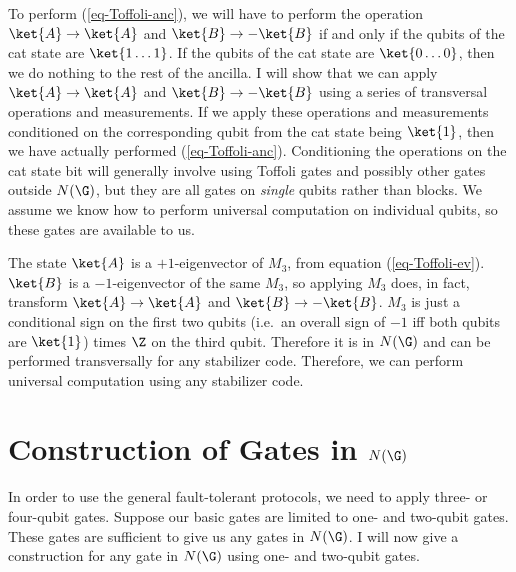 To perform (\ref{eq-Toffoli-anc}), we will have to perform the operation
$\ket{A} \rightarrow \ket{A}$ and $\ket{B} \rightarrow - \ket{B}$ if and
only if the
qubits of the cat state are $\ket{1 \ldots 1}$.  If the qubits of the cat state
are $\ket{0 \ldots 0}$, then we do nothing to the rest of the ancilla.  I will
show that we can apply $\ket{A} \rightarrow \ket{A}$ and $\ket{B}
\rightarrow - \ket{B}$ using a series of transversal operations and
measurements.  If we apply these operations and measurements
conditioned on the corresponding qubit from the cat state being $\ket{1}$,
then we have actually performed (\ref{eq-Toffoli-anc}).  Conditioning the
operations on the cat state bit will generally involve using Toffoli gates and
possibly other gates outside $N(\G)$, but they are all gates on {\em single}
qubits rather than blocks.  We assume we know how to perform universal
computation on individual qubits, so these gates are available to us.

The state $\ket{A}$ is a $+1$-eigenvector of $M_3$, from equation
(\ref{eq-Toffoli-ev}).  $\ket{B}$ is a $-1$-eigenvector of the same $M_3$,
so applying $M_3$ does, in fact, transform $\ket{A} \rightarrow \ket{A}$
and $\ket{B} \rightarrow - \ket{B}$.  $M_3$ is just a conditional sign on
the first two qubits (i.e.\ an overall sign of $-1$ iff both qubits are
$\ket{1}$) times $\Z$ on the third qubit.  Therefore it is in $N(\G)$ and
can be performed transversally for any stabilizer code.  Therefore, we can
perform universal computation using any stabilizer code.

\section{Construction of Gates in $N(\G)$}

In order to use the general fault-tolerant protocols, we need to apply
three- or four-qubit gates.  Suppose our basic gates are limited to one- and
two-qubit gates.  These gates are sufficient to give us any gates in $N(\G)$.
I will now give a construction for any gate in $N(\G)$ using one- and
two-qubit gates.

